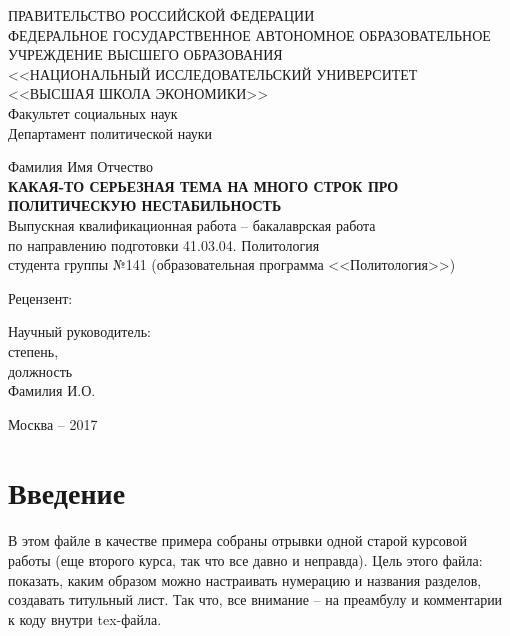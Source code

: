 \documentclass[14pt]{extarticle} %
\begin{document}
\begin{titlepage} 
\begin{center}
ПРАВИТЕЛЬСТВО РОССИЙСКОЙ ФЕДЕРАЦИИ \\
ФЕДЕРАЛЬНОЕ ГОСУДАРСТВЕННОЕ АВТОНОМНОЕ ОБРАЗОВАТЕЛЬНОЕ \\
УЧРЕЖДЕНИЕ ВЫСШЕГО ОБРАЗОВАНИЯ \\
<<НАЦИОНАЛЬНЫЙ ИССЛЕДОВАТЕЛЬСКИЙ УНИВЕРСИТЕТ \\
<<ВЫСШАЯ ШКОЛА ЭКОНОМИКИ>> \medskip\\
Факультет социальных наук \\
Департамент политической науки \\
\vspace{2cm} %

Фамилия Имя Отчество \\
\textbf{КАКАЯ-ТО СЕРЬЕЗНАЯ ТЕМА НА МНОГО СТРОК ПРО ПОЛИТИЧЕСКУЮ НЕСТАБИЛЬНОСТЬ} \bigskip\\
 Выпускная квалификационная работа -- бакалаврская работа \\
 по направлению подготовки 41.03.04. Политология \\
 студента группы №141 (образовательная программа <<Политология>>)
\end{center}

\begin{flushleft} Рецензент: \end{flushleft} %
\begin{flushright} %
Научный руководитель: \\
степень, \\
должность \\
Фамилия И.О.
\end{flushright} 
\vfill %

\begin{center} Москва -- 2017 \end{center}
\end{titlepage}
\newpage

\tableofcontents %

\newpage

\section*{Введение} %
В этом файле в качестве примера собраны отрывки одной старой курсовой работы (еще второго курса, так что все давно и неправда). Цель этого файла: показать, каким образом можно настраивать нумерацию и названия разделов, создавать титульный лист. Так что, все внимание -- на преамбулу и комментарии к коду внутри tex-файла.
\end{document}
